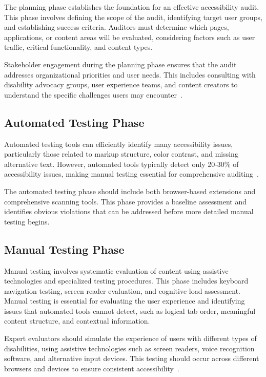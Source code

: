 The planning phase establishes the foundation for an effective accessibility audit. This phase involves defining the scope of the audit, identifying target user groups, and establishing success criteria. Auditors must determine which pages, applications, or content areas will be evaluated, considering factors such as user traffic, critical functionality, and content types.

Stakeholder engagement during the planning phase ensures that the audit addresses organizational priorities and user needs. This includes consulting with disability advocacy groups, user experience teams, and content creators to understand the specific challenges users may encounter~\cite{DisabilityRightsAuditing}.

\subsection{Automated Testing Phase}

Automated testing tools can efficiently identify many accessibility issues, particularly those related to markup structure, color contrast, and missing alternative text. However, automated tools typically detect only 20-30\% of accessibility issues, making manual testing essential for comprehensive auditing~\cite{WebAIMSurvey}.

The automated testing phase should include both browser-based extensions and comprehensive scanning tools. This phase provides a baseline assessment and identifies obvious violations that can be addressed before more detailed manual testing begins.

\subsection{Manual Testing Phase}

Manual testing involves systematic evaluation of content using assistive technologies and specialized testing procedures. This phase includes keyboard navigation testing, screen reader evaluation, and cognitive load assessment. Manual testing is essential for evaluating the user experience and identifying issues that automated tools cannot detect, such as logical tab order, meaningful content structure, and contextual information.

Expert evaluators should simulate the experience of users with different types of disabilities, using assistive technologies such as screen readers, voice recognition software, and alternative input devices. This testing should occur across different browsers and devices to ensure consistent accessibility~\cite{PowerAccessibility}.

